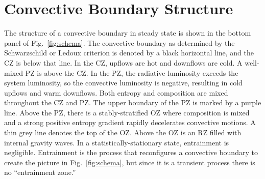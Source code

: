 \section{Convective Boundary Structure}
\label{sec:structure}
The structure of a convective boundary in steady state is shown in the bottom panel of Fig.~\ref{fig:schema}.
The convective boundary as determined by the Schwarzschild or Ledoux criterion is denoted by a black horizontal line, and the CZ is below that line.
In the CZ, upflows are hot and downflows are cold.
A well-mixed PZ is above the CZ.
In the PZ, the radiative luminosity exceeds the system luminosity, so the convective luminosity is negative, resulting in cold upflows and warm downflows.
Both entropy and composition are mixed throughout the CZ and PZ.
The upper boundary of the PZ is marked by a purple line.
Above the PZ, there is a stably-stratified OZ where composition is mixed and a strong positive entropy gradient rapidly decelerates convective motions.
A thin grey line denotes the top of the OZ.
Above the OZ is an RZ filled with internal gravity waves.
In a statistically-stationary state, entrainment is negligible.
Entrainment is the process that reconfigures a convective boundary to create the picture in Fig.~\ref{fig:schema}, but since it is a transient process there is no ``entrainment zone.''
